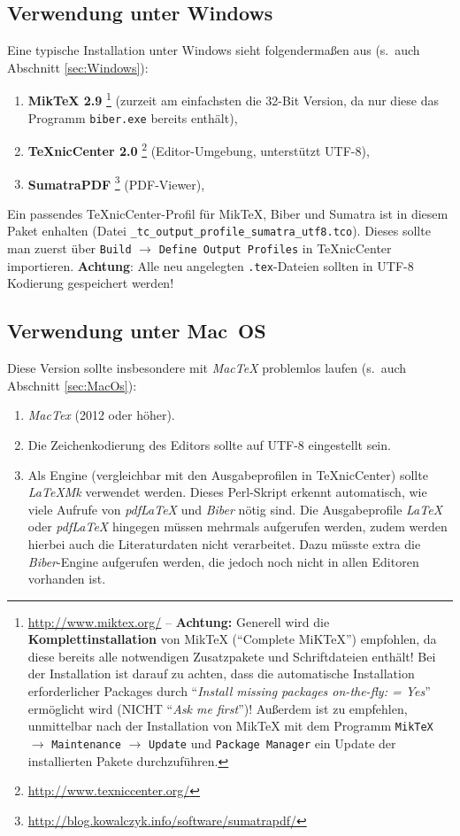 \subsection{Verwendung unter Windows}

Eine typische Installation unter Windows sieht folgendermaßen aus
(s.\ auch Abschnitt \ref{sec:Windows}):
%
\begin{enumerate}
\item \textbf{MikTeX 2.9}%
	\footnote{\url{http://www.miktex.org/} -- \textbf{Achtung:} 
	Generell wird die \textbf{Komplett\-installation} von MikTeX ("`Complete MiKTeX"') empfohlen, 
	da diese bereits alle notwendigen Zusatzpakete und Schriftdateien enthält! 
	Bei der Installation ist darauf zu achten, 
	dass die automatische Installation erforderlicher Packages 
	durch "`\emph{Install missing packages on-the-fly: = Yes}"' ermöglicht wird (NICHT "`\emph{Ask me first}"')!
	Außerdem ist zu empfehlen, unmittelbar nach der Installation von MikTeX mit dem Programm
	\texttt{MikTeX} $\to$ \texttt{Maintenance} $\to$ \texttt{Update} und \texttt{Package Manager} 
	ein Update der installierten Pakete durchzuführen.}
	(zurzeit am einfachsten die 32-Bit Version, da nur diese das Programm \texttt{biber.exe} 
	bereits enthält),
\item \textbf{TeXnicCenter 2.0}%
	\footnote{\url{http://www.texniccenter.org/}}
	(Editor-Umgebung, unterstützt UTF-8),
\item \textbf{SumatraPDF}%
	\footnote{\url{http://blog.kowalczyk.info/software/sumatrapdf/}} 
	(PDF-Viewer),
\end{enumerate}
%
Ein passendes TeXnicCenter-Profil für MikTeX, Biber und Sumatra ist in diesem Paket enhalten
(Datei \verb!_tc_output_profile_sumatra_utf8.tco!). Dieses sollte man zuerst
über \texttt{Build} $\to$ \texttt{Define Output Profiles} in TeXnicCenter importieren.
\textbf{Achtung}: Alle neu angelegten \texttt{.tex}-Dateien sollten in UTF-8 Kodierung gespeichert werden!




\subsection{Verwendung unter Mac~OS}


Diese Version sollte insbesondere mit \emph{MacTeX} problemlos laufen (s.\ auch Abschnitt \ref{sec:MacOs}):
\begin{enumerate}
\item 
	\emph{MacTex} (2012 oder höher).
\item 
	Die Zeichenkodierung des Editors sollte auf UTF-8 eingestellt sein.
\item 
	Als Engine (vergleichbar mit den Ausgabeprofilen in TeXnicCenter) sollte \emph{LaTeXMk} verwendet werden. 
	Dieses Perl-Skript erkennt automatisch, wie viele Aufrufe von \emph{pdfLaTeX} und \emph{Biber} nötig sind. 
	Die Ausgabeprofile \emph{LaTeX} oder \emph{pdfLaTeX} hingegen müssen mehrmals aufgerufen werden, 
	zudem werden hierbei auch die Literaturdaten nicht verarbeitet. Dazu müsste extra die \emph{Biber}-Engine 
	aufgerufen werden, 	die jedoch noch nicht in allen Editoren vorhanden ist.
\end{enumerate}



